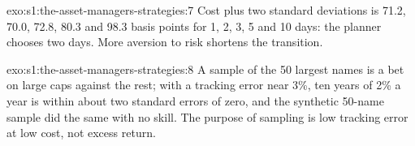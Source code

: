 \begin{solution}{exo:s1:the-asset-managers-strategies:7}
Cost plus two standard deviations is 71.2, 70.0, 72.8, 80.3 and 98.3 basis points for 1, 2, 3, 5 and 10 days: the planner chooses two days. More
aversion to risk shortens the transition.
\end{solution}

\begin{solution}{exo:s1:the-asset-managers-strategies:8}
A sample of the 50 largest names is a bet on large caps against the rest; with a tracking error near 3\%, ten years of 2\% a year is within about two
standard errors of zero, and the synthetic 50-name sample did the same with no skill. The purpose of sampling is low tracking error at low cost, not
excess return.
\end{solution}

